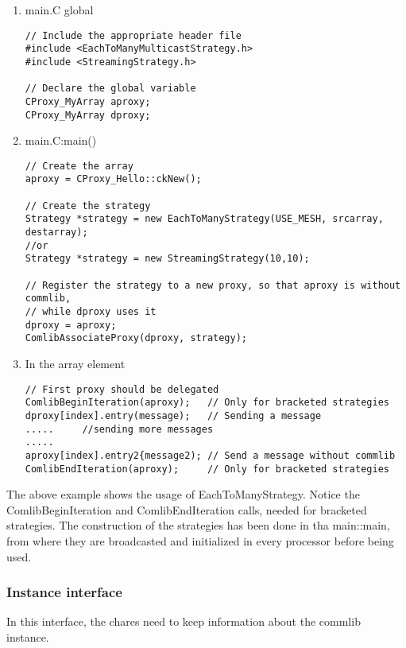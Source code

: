 \begin{enumerate}
\item main.C global
\begin{verbatim}
// Include the appropriate header file
#include <EachToManyMulticastStrategy.h>
#include <StreamingStrategy.h>

// Declare the global variable
CProxy_MyArray aproxy;
CProxy_MyArray dproxy;
\end{verbatim}

\item main.C:main()
\begin{verbatim}
// Create the array
aproxy = CProxy_Hello::ckNew();

// Create the strategy
Strategy *strategy = new EachToManyStrategy(USE_MESH, srcarray, destarray);
//or
Strategy *strategy = new StreamingStrategy(10,10);

// Register the strategy to a new proxy, so that aproxy is without commlib,
// while dproxy uses it
dproxy = aproxy;
ComlibAssociateProxy(dproxy, strategy);
\end{verbatim}

\item In the array element
\begin{verbatim}
// First proxy should be delegated
ComlibBeginIteration(aproxy);   // Only for bracketed strategies
dproxy[index].entry(message);   // Sending a message
.....     //sending more messages
.....
aproxy[index].entry2{message2); // Send a message without commlib
ComlibEndIteration(aproxy);     // Only for bracketed strategies
\end{verbatim}
\end{enumerate}

The above example shows the usage of EachToManyStrategy. Notice the
ComlibBeginIteration and ComlibEndIteration calls, needed for bracketed
strategies. The construction of the strategies has been done in tha main::main,
from where they are broadcasted and initialized in every processor before being
used.

\subsubsection{Instance interface}

In this interface, the chares need to keep information about the commlib instance.

